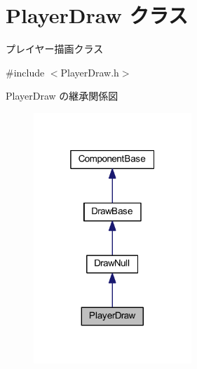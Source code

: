 \hypertarget{class_player_draw}{}\section{Player\+Draw クラス}
\label{class_player_draw}


プレイヤー描画クラス  




{\ttfamily \#include $<$Player\+Draw.\+h$>$}



Player\+Draw の継承関係図\nopagebreak
\begin{figure}[H]
\begin{center}
\leavevmode
\includegraphics[width=169pt]{class_player_draw__inherit__graph}
\end{center}
\end{figure}
